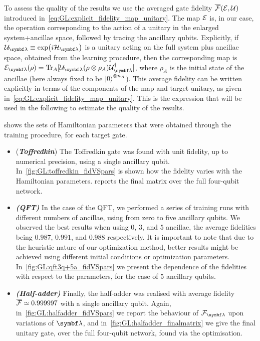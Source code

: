 To assess the quality of the results we use the averaged gate fidelity $\overline{{\mathcal{F}}}({\mathcal{E}},{\mathcal{U}})$ introduced in~\cref{eq:GL:explicit_fidelity_map_unitary}.
The map ${\mathcal{E}}$ is, in our case, the operation corresponding to the action of a unitary in the enlarged system+ancillae space, followed by tracing the ancillary qubits.
Explicitly, if $\calU_\bslambda\equiv\exp(i\calH_\bslambda)$ is a unitary acting on the full system plus ancillae space, obtained from the learning procedure, then the corresponding map is
$\calE_\bslambda(\rho) = \Tr_A[\calU_\bslambda(\rho\otimes\rho_A) \calU_\bslambda^\dagger]$,
where $\rho_A$ is the initial state of the ancillae (here always fixed to be $\ket0^{\otimes n_A}$).
This average fidelity can be written explicitly in terms of the components of the map and target unitary, as given in~\cref{eq:GL:explicit_fidelity_map_unitary}. This is the expression that will be used in the following to estimate the quality of the results.

 shows the sets of Hamiltonian parameters that were obtained through the training procedure, for each target gate.
\begin{itemize}
    \item (\textbf{\emph{Toffredkin}}) The Toffredkin gate was found with unit fidelity, up to numerical precision, using a single ancillary qubit. In~\cref{fig:GL:toffredkin_fidVSpars} is shown how the fidelity varies with the Hamiltonian parameters.  reports the final matrix over the full four-qubit network.
    \item \textbf{\emph{(QFT)}} In the case of the \ac{QFT}, we performed a series of training runs with different numbers of ancillae, using from zero to five ancillary qubits.
    We observed the best results when using $0$, $3$, and $5$ ancillae, the average fidelities being $0.987$, $0.991$, and $0.988$ respectively.
    It is important to note that due to the heuristic nature of our optimization method, better results might be achieved using different initial conditions or optimization parameters.
    In~\cref{fig:GL:qft3q+5a_fidVSpars} we present the dependence of the fidelities with respect to the parameters, for the case of $5$ ancillary qubits.
    \item \textbf{\emph{(Half-adder)}} Finally, the half-adder was realised with average fidelity $\overline{{\mathcal{F}}}\simeq0.999997$ with a single ancillary qubit.
    Again, in~\cref{fig:GL:halfadder_fidVSpars} we report the behaviour of $\calF_\bslambda$ upon variations of $\bslambda$, and in~\cref{fig:GL:halfadder_finalmatrix} we give the final unitary gate, over the full four-qubit network, found via the optimisation.
\end{itemize}

